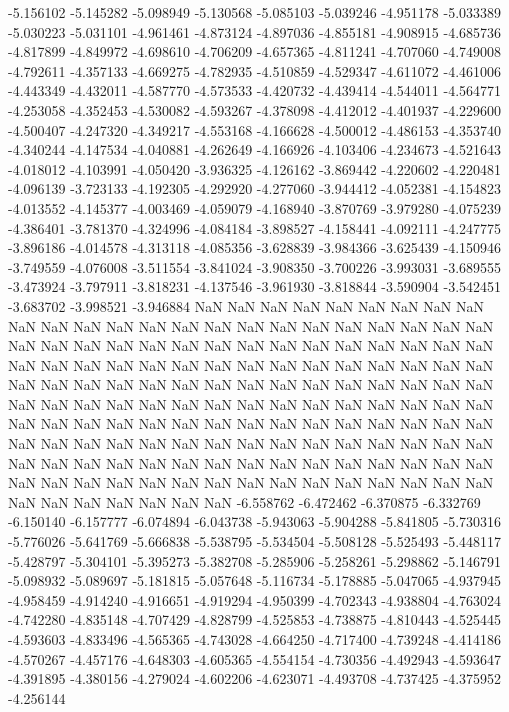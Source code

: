 -5.156102
-5.145282
-5.098949
-5.130568
-5.085103
-5.039246
-4.951178
-5.033389
-5.030223
-5.031101
-4.961461
-4.873124
-4.897036
-4.855181
-4.908915
-4.685736
-4.817899
-4.849972
-4.698610
-4.706209
-4.657365
-4.811241
-4.707060
-4.749008
-4.792611
-4.357133
-4.669275
-4.782935
-4.510859
-4.529347
-4.611072
-4.461006
-4.443349
-4.432011
-4.587770
-4.573533
-4.420732
-4.439414
-4.544011
-4.564771
-4.253058
-4.352453
-4.530082
-4.593267
-4.378098
-4.412012
-4.401937
-4.229600
-4.500407
-4.247320
-4.349217
-4.553168
-4.166628
-4.500012
-4.486153
-4.353740
-4.340244
-4.147534
-4.040881
-4.262649
-4.166926
-4.103406
-4.234673
-4.521643
-4.018012
-4.103991
-4.050420
-3.936325
-4.126162
-3.869442
-4.220602
-4.220481
-4.096139
-3.723133
-4.192305
-4.292920
-4.277060
-3.944412
-4.052381
-4.154823
-4.013552
-4.145377
-4.003469
-4.059079
-4.168940
-3.870769
-3.979280
-4.075239
-4.386401
-3.781370
-4.324996
-4.084184
-3.898527
-4.158441
-4.092111
-4.247775
-3.896186
-4.014578
-4.313118
-4.085356
-3.628839
-3.984366
-3.625439
-4.150946
-3.749559
-4.076008
-3.511554
-3.841024
-3.908350
-3.700226
-3.993031
-3.689555
-3.473924
-3.797911
-3.818231
-4.137546
-3.961930
-3.818844
-3.590904
-3.542451
-3.683702
-3.998521
-3.946884
NaN
NaN
NaN
NaN
NaN
NaN
NaN
NaN
NaN
NaN
NaN
NaN
NaN
NaN
NaN
NaN
NaN
NaN
NaN
NaN
NaN
NaN
NaN
NaN
NaN
NaN
NaN
NaN
NaN
NaN
NaN
NaN
NaN
NaN
NaN
NaN
NaN
NaN
NaN
NaN
NaN
NaN
NaN
NaN
NaN
NaN
NaN
NaN
NaN
NaN
NaN
NaN
NaN
NaN
NaN
NaN
NaN
NaN
NaN
NaN
NaN
NaN
NaN
NaN
NaN
NaN
NaN
NaN
NaN
NaN
NaN
NaN
NaN
NaN
NaN
NaN
NaN
NaN
NaN
NaN
NaN
NaN
NaN
NaN
NaN
NaN
NaN
NaN
NaN
NaN
NaN
NaN
NaN
NaN
NaN
NaN
NaN
NaN
NaN
NaN
NaN
NaN
NaN
NaN
NaN
NaN
NaN
NaN
NaN
NaN
NaN
NaN
NaN
NaN
NaN
NaN
NaN
NaN
NaN
NaN
NaN
NaN
NaN
NaN
NaN
NaN
NaN
NaN
NaN
NaN
NaN
NaN
NaN
NaN
NaN
NaN
NaN
NaN
NaN
NaN
NaN
NaN
NaN
NaN
NaN
NaN
NaN
NaN
NaN
NaN
NaN
-6.558762
-6.472462
-6.370875
-6.332769
-6.150140
-6.157777
-6.074894
-6.043738
-5.943063
-5.904288
-5.841805
-5.730316
-5.776026
-5.641769
-5.666838
-5.538795
-5.534504
-5.508128
-5.525493
-5.448117
-5.428797
-5.304101
-5.395273
-5.382708
-5.285906
-5.258261
-5.298862
-5.146791
-5.098932
-5.089697
-5.181815
-5.057648
-5.116734
-5.178885
-5.047065
-4.937945
-4.958459
-4.914240
-4.916651
-4.919294
-4.950399
-4.702343
-4.938804
-4.763024
-4.742280
-4.835148
-4.707429
-4.828799
-4.525853
-4.738875
-4.810443
-4.525445
-4.593603
-4.833496
-4.565365
-4.743028
-4.664250
-4.717400
-4.739248
-4.414186
-4.570267
-4.457176
-4.648303
-4.605365
-4.554154
-4.730356
-4.492943
-4.593647
-4.391895
-4.380156
-4.279024
-4.602206
-4.623071
-4.493708
-4.737425
-4.375952
-4.256144
